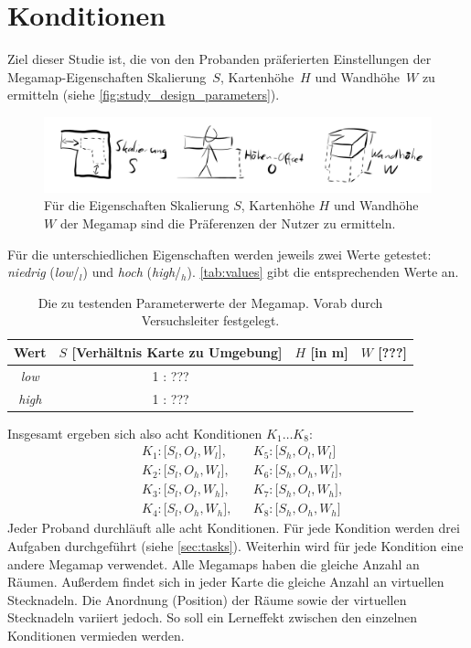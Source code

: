 \documentclass[
    draft=false,
    paper=a4,
    fontsize=12pt,
    twoside=false,
    captions=tableheading,
    british, ngerman,
]{scrartcl}
\begin{document}
\section{Konditionen}
\label{sec:conditions}
Ziel dieser Studie ist, die von den Probanden prä\-fe\-rier\-ten Einstellungen der Megamap-Ei\-gen\-schaf\-ten Skalierung\ $S$, Kartenhöhe\ $H$ und Wandhöhe\ $W$ zu ermitteln (siehe \autoref{fig:study_design_parameters}).
\begin{figure}[p]
    \centering
    \includegraphics[width=\textwidth]{study_design_parameters}
    \caption{Für die Eigenschaften Skalierung $S$, Kartenhöhe $H$ und Wandhöhe $W$ der Megamap sind die Präferenzen der Nutzer zu ermitteln.}
    \label{fig:study_design_parameters}
\end{figure}
Für die unterschiedlichen Eigenschaften werden jeweils zwei Werte getestet: \emph{niedrig} (\emph{low}/$_l$) und \emph{hoch} (\emph{high}/$_h$).
\autoref{tab:values} gibt die entsprechenden Werte an.
\begin{table}[hb]
    \centering
    \caption{Die zu testenden Parameterwerte der Megamap. %
    Vorab durch Versuchsleiter festgelegt.}
    \label{tab:values}
    \begin{tabular}{cccc}
        Wert & $S$ [Verhältnis Karte zu Umgebung] & $H$ [in \si{\meter}] & $W$ [???] \\\toprule
        \emph{low} & 1 : ??? & & \\\midrule
        \emph{high} & 1 : ??? & & \\\bottomrule
    \end{tabular}
\end{table}

Insgesamt ergeben sich also acht Konditionen $K_1 \dots K_8$:
\begin{align*}
    &K_1: \lbrack S_l, O_l, W_l \rbrack, && K_5: \lbrack S_h, O_l, W_l \rbrack\\
    &K_2: \lbrack S_l, O_h, W_l \rbrack, && K_6: \lbrack S_h, O_h, W_l \rbrack,\\
    &K_3: \lbrack S_l, O_l, W_h \rbrack, && K_7: \lbrack S_h, O_l, W_h \rbrack,\\
    &K_4: \lbrack S_l, O_h, W_h \rbrack, && K_8: \lbrack S_h, O_h, W_h \rbrack
\end{align*}
Jeder Proband durchläuft alle acht Konditionen.
Für jede Kondition werden drei Aufgaben durchgeführt (siehe \autoref{sec:tasks}).
Weiterhin wird für jede Kondition eine andere Megamap verwendet.
Alle Megamaps haben die gleiche Anzahl an Räumen.
Außerdem findet sich in jeder Karte die gleiche Anzahl an virtuellen Stecknadeln.
Die Anordnung (Position) der Räume sowie der virtuellen Stecknadeln variiert jedoch.
So soll ein Lerneffekt zwischen den einzelnen Konditionen vermieden werden.
\end{document}
